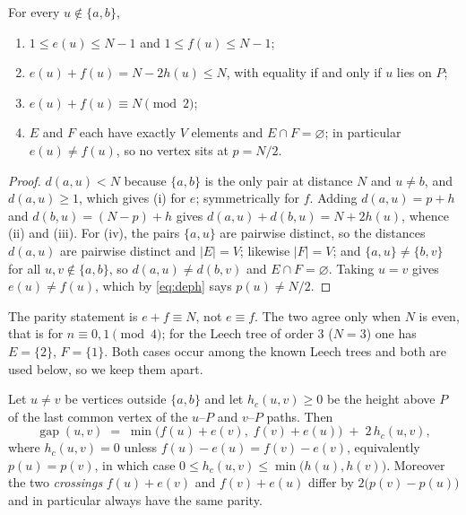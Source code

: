 \begin{lemma}\label{lem:decoord}
For every $u\notin\{a,b\}$,
\begin{enumerate}
\item[(i)] $1\le e(u)\le N-1$ and $1\le f(u)\le N-1$;
\item[(ii)] $e(u)+f(u)=N-2h(u)\le N$, with equality if and only if $u$ lies on $P$;
\item[(iii)] $e(u)+f(u)\equiv N\pmod 2$;
\item[(iv)] $E$ and $F$ each have exactly $V$ elements and $E\cap F=\varnothing$;
in particular $e(u)\ne f(u)$, so no vertex sits at $p=N/2$.
\end{enumerate}
\end{lemma}

\begin{proof}
$d(a,u)<N$ because $\{a,b\}$ is the only pair at distance $N$ and $u\ne b$, and
$d(a,u)\ge1$, which gives (i) for $e$; symmetrically for $f$.  Adding
$d(a,u)=p+h$ and $d(b,u)=(N-p)+h$ gives $d(a,u)+d(b,u)=N+2h(u)$, whence (ii)
and (iii).  For (iv), the pairs $\{a,u\}$ are pairwise distinct, so the
distances $d(a,u)$ are pairwise distinct and $|E|=V$; likewise $|F|=V$; and
$\{a,u\}\ne\{b,v\}$ for all $u,v\notin\{a,b\}$, so $d(a,u)\ne d(b,v)$ and
$E\cap F=\varnothing$.  Taking $u=v$ gives $e(u)\ne f(u)$, which by
\eqref{eq:deph} says $p(u)\ne N/2$.
\end{proof}

\begin{remark*}
The parity statement is $e+f\equiv N$, not $e\equiv f$.  The two agree only
when $N$ is even, that is for $n\equiv0,1\pmod4$; for the Leech tree of order
$3$ ($N=3$) one has $E=\{2\}$, $F=\{1\}$.  Both cases occur among the known
Leech trees and both are used below, so we keep them apart.
\end{remark*}

\begin{lemma}\label{lem:degap}
Let $u\ne v$ be vertices outside $\{a,b\}$ and let $h_c(u,v)\ge0$ be the height
above $P$ of the last common vertex of the $u$--$P$ and $v$--$P$ paths.  Then
\begin{equation}\label{eq:degap}
  \operatorname{gap}(u,v)\;=\;\min\bigl(f(u)+e(v),\;f(v)+e(u)\bigr)\;+\;2\,h_c(u,v),
\end{equation}
where $h_c(u,v)=0$ unless $f(u)-e(u)=f(v)-e(v)$, equivalently $p(u)=p(v)$, in
which case $0\le h_c(u,v)\le\min\bigl(h(u),h(v)\bigr)$.  Moreover the two
\emph{crossings} $f(u)+e(v)$ and $f(v)+e(u)$ differ by $2\bigl(p(v)-p(u)\bigr)$
and in particular always have the same parity.
\end{lemma}


